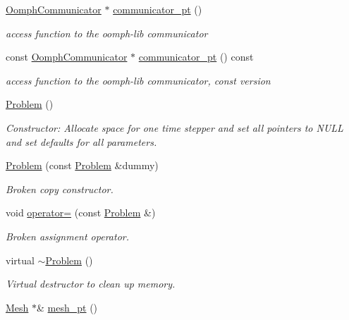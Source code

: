 \begin{DoxyCompactItemize}
\hyperlink{classoomph_1_1OomphCommunicator}{Oomph\+Communicator} $\ast$ \hyperlink{classoomph_1_1Problem_a600bb1740edd0aa07c6d001033bf676a}{communicator\+\_\+pt} ()
\begin{DoxyCompactList}\small\item\em access function to the oomph-\/lib communicator \end{DoxyCompactList}\item 
const \hyperlink{classoomph_1_1OomphCommunicator}{Oomph\+Communicator} $\ast$ \hyperlink{classoomph_1_1Problem_af1875e771e99a2e8f1d344d8b880d0de}{communicator\+\_\+pt} () const
\begin{DoxyCompactList}\small\item\em access function to the oomph-\/lib communicator, const version \end{DoxyCompactList}\item 
\hyperlink{classoomph_1_1Problem_a3f071f2f8be895dbe0d39d12ca59acf4}{Problem} ()
\begin{DoxyCompactList}\small\item\em Constructor\+: Allocate space for one time stepper and set all pointers to N\+U\+LL and set defaults for all parameters. \end{DoxyCompactList}\item 
\hyperlink{classoomph_1_1Problem_a0ff735963d632b344d2172f9777fbfed}{Problem} (const \hyperlink{classoomph_1_1Problem}{Problem} \&dummy)
\begin{DoxyCompactList}\small\item\em Broken copy constructor. \end{DoxyCompactList}\item 
void \hyperlink{classoomph_1_1Problem_ac620c30ee290674e73efcf159d533c01}{operator=} (const \hyperlink{classoomph_1_1Problem}{Problem} \&)
\begin{DoxyCompactList}\small\item\em Broken assignment operator. \end{DoxyCompactList}\item 
virtual \hyperlink{classoomph_1_1Problem_ae2cd468ec03f7ede23c0dc8eea3be1cf}{$\sim$\+Problem} ()
\begin{DoxyCompactList}\small\item\em Virtual destructor to clean up memory. \end{DoxyCompactList}\item 
\hyperlink{classoomph_1_1Mesh}{Mesh} $\ast$\& \hyperlink{classoomph_1_1Problem_aad122d70a22dc5302cfd5853d3cf3057}{mesh\+\_\+pt} ()

\end{DoxyCompactItemize}
